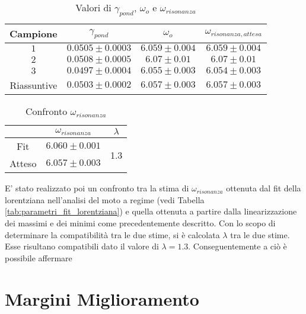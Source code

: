 \documentclass[a4paper,11pt,oneside]{article}
\begin{document}
\begin{table}[h!]
    \centering
    \begin{tabular}{|c|c|c|c|}
        \hline
        Campione & $\gamma_{pond}$ & $\omega_o$ & $\omega_{risonanza,attesa}$ \\ \hline
        \rowcolor[rgb]{0.85,0.85,0.85}$1$ & $0.0505\pm0.0003$ & $6.059\pm0.004$ & $6.059\pm0.004$ \\ \hline
        $2$ & $0.0508\pm0.0005$ & $6.07\pm0.01$ & $6.07\pm0.01$ \\ \hline
        \rowcolor[rgb]{0.85,0.85,0.85}$3$ & $0.0497\pm0.0004$ & $6.055\pm0.003$ & $6.054\pm0.003$ \\ \hline \hline
        Riassuntive & $0.0503\pm0.0002$ & $6.057\pm0.003$ & $6.057\pm0.003$ \\ \hline
    \end{tabular}
    \caption{Valori di $\gamma_{pond}$, $\omega_o$ e $\omega_{risonanza}$}
    \label{tab:valori_gamma_omega}
\end{table}

\begin{wraptable}{r}{5cm}
    \centering
    \begin{tabular}{c|c|c|}
        \cline{2-3}
        & $\omega_{risonanza}$ & $\lambda$ \\ \hline
        \multicolumn{1}{|c|}{Fit} & $6.060\pm0.001$ & \multirow{2}{*}{1.3} \\ \cline{1-2}
        \multicolumn{1}{|c|}{Atteso} & $6.057\pm0.003$ &\\ \hline
    \end{tabular}
    \caption{Confronto $\omega_{risonanza}$}
    \label{tab:confronto_omega_r}
\end{wraptable}
E' stato realizzato poi un confronto tra la stima di $\omega_{risonanza}$ ottenuta dal fit della lorentziana nell'analisi del moto a regime (vedi Tabella \ref{tab:parametri_fit_lorentziana}) e quella ottenuta a partire dalla linearizzazione dei massimi e dei minimi come precedentemente descritto. Con lo scopo di determinare la compatibilità tra le due stime, si è calcolata $\lambda$ tra le due stime. Esse risultano compatibili dato il valore di $\lambda = 1.3$. Conseguentemente a ciò è possibile affermare 




\section{Margini Miglioramento}
\end{document}
